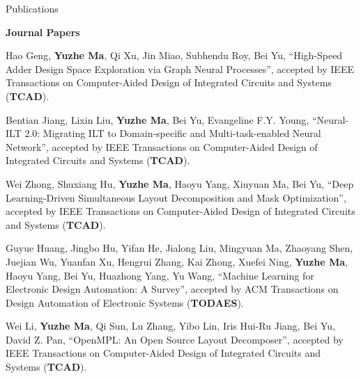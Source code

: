 \begin{rSection}{Publications}

\iffalse
\textbf{Books / Book Chapters}
\begin{description}[font=\normalfont]

\end{description}
\fi

\textbf{Journal Papers}
\begin{description}[font=\normalfont]
\iffalse
\item \textbf{Submitted}

\fi


\item[{[J14]}] {
    Hao Geng, \textbf{Yuzhe Ma}, Qi Xu, Jin Miao, Subhendu Roy, Bei Yu,
    ``High-Speed Adder Design Space Exploration via Graph Neural Processes'',
    accepted by IEEE Transactions on Computer-Aided Design of Integrated Circuits and Systems (\textbf{TCAD}).
}


\item[{[J13]}] {
    Bentian Jiang, Lixin Liu, \textbf{Yuzhe Ma}, Bei Yu, Evangeline F.Y. Young,
    ``Neural-ILT 2.0: Migrating ILT to Domain-specific and Multi-task-enabled Neural Network'',
    accepted by IEEE Transactions on Computer-Aided Design of Integrated Circuits and Systems (\textbf{TCAD}).
}

\item[{[J12]}] {
        Wei Zhong, Shuxiang Hu, \textbf{Yuzhe Ma}, Haoyu Yang, Xiuyuan Ma, Bei Yu,
        ``Deep Learning-Driven Simultaneous Layout Decomposition and Mask Optimization'',
        accepted by IEEE Transactions on Computer-Aided Design of Integrated Circuits and Systems (\textbf{TCAD}).
}

\item[{[J11]}] {
        Guyue Huang, Jingbo Hu, Yifan He, Jialong Liu, Mingyuan Ma, Zhaoyang Shen, Juejian Wu, Yuanfan Xu, Hengrui Zhang, Kai Zhong, Xuefei Ning, \textbf{Yuzhe Ma}, Haoyu Yang, Bei Yu, Huazhong Yang, Yu Wang,
        ``Machine Learning for Electronic Design Automation: A Survey'',
        accepted by ACM Transactions on Design Automation of Electronic Systems (\textbf{TODAES}).
}

\item[{[J10]}]{
        Wei Li, \textbf{Yuzhe Ma}, Qi Sun, Lu Zhang, Yibo Lin, Iris Hui-Ru Jiang, Bei Yu, David Z. Pan,
        ``OpenMPL: An Open Source Layout Decomposer'',
        accepted by IEEE Transactions on Computer-Aided Design of Integrated Circuits and Systems (\textbf{TCAD}).
    }


\end{description}
\end{rSection}
